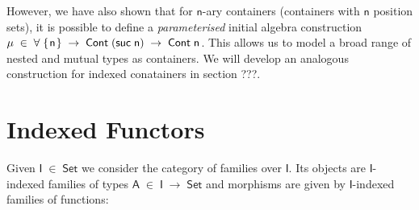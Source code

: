 \documentclass[a4paper]{article}
\makeatletter
\newcommand{\Conid}[1]{\mathit{#1}}
\newcommand{\Varid}[1]{\mathit{#1}}
\newcommand{\anonymous}{\kern0.06em \vbox{\hrule\@width.5em}}
\def\resethooks{%
  \global\let\SaveRestoreHook\empty
  \global\let\ColumnHook\empty}
\newlength{\blanklineskip}
\let\hspre\empty
\let\hspost\empty
\renewcommand\Varid[1]{\mathord{\textsf{#1}}}
\let\Conid\Varid
\makeatother
\begin{document}
However, we have also shown that for \ensuremath{\Varid{n}}-ary containers (containers with \ensuremath{\Varid{n}} position sets), it is possible to define a \emph{parameterised} initial algebra construction \ensuremath{\mu\;\in\;\forall{}\;\{\mskip1.5mu \Varid{n}\mskip1.5mu\}\;\rightarrow\;\Conid{Cont}\;(\Varid{suc}\;\Varid{n})\;\rightarrow\;\Conid{Cont}\;\Varid{n}}. This allows us to model a broad range of nested and mutual types as containers. We will develop an analogous construction for indexed conatainers in section ???.




\section{Indexed Functors}


Given \ensuremath{\Conid{I}\;\in\;\Conid{Set}} we consider the category of families over \ensuremath{\Conid{I}}. Its objects are
\ensuremath{\Conid{I}}-indexed families of types \ensuremath{\Conid{A}\;\in\;\Conid{I}\;\rightarrow\;\Conid{Set}} and morphisms are given by 
\ensuremath{\Conid{I}}-indexed families of functions:


\resethooks
\end{document}
